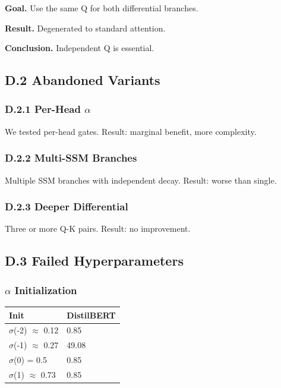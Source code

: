 \textbf{Goal.} Use the same Q for both differential branches.

\textbf{Result.} Degenerated to standard attention.

\textbf{Conclusion.} Independent Q is essential.

\subsection{D.2 Abandoned Variants}

\subsubsection{D.2.1 Per-Head $\alpha$}

We tested per-head gates. Result: marginal benefit, more complexity.

\subsubsection{D.2.2 Multi-SSM Branches}

Multiple SSM branches with independent decay. Result: worse than single.

\subsubsection{D.2.3 Deeper Differential}

Three or more Q-K pairs. Result: no improvement.

\subsection{D.3 Failed Hyperparameters}

\subsubsection{$\alpha$ Initialization}

\begin{table}[H]
\centering
\small
\begin{tabular}{ll}
\toprule
\textbf{Init} & \textbf{DistilBERT} \\
\midrule
$\sigma$(-2) $\approx$ 0.12 & 0.85 \\
$\sigma$(-1) $\approx$ 0.27 & 49.08 \\
$\sigma$(0) = 0.5 & 0.85 \\
$\sigma$(1) $\approx$ 0.73 & 0.85 \\
\bottomrule
\end{tabular}
\end{table}


